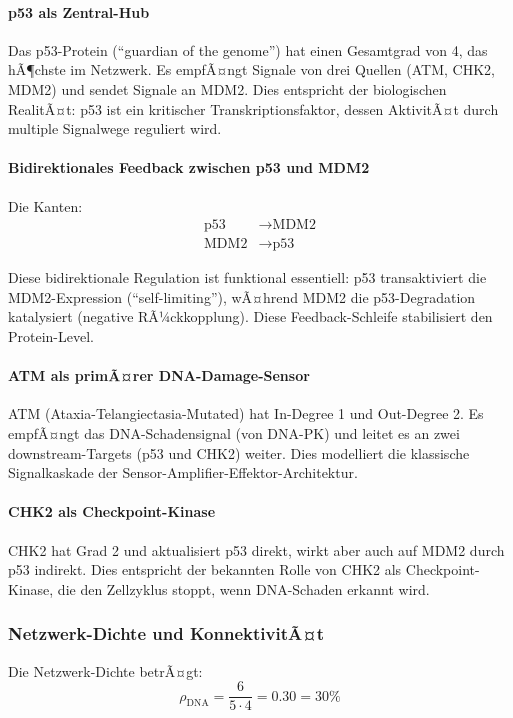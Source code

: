 ﻿\documentclass[a4paper,12pt]{article}
\theoremstyle{definition}
\begin{document}
\paragraph{p53 als Zentral-Hub}
Das p53-Protein (``guardian of the genome'') hat einen Gesamtgrad von 4, das hÃ¶chste im Netzwerk. Es empfÃ¤ngt Signale von drei Quellen (ATM, CHK2, MDM2) und sendet Signale an MDM2. Dies entspricht der biologischen RealitÃ¤t: p53 ist ein kritischer Transkriptionsfaktor, dessen AktivitÃ¤t durch multiple Signalwege reguliert wird.

\paragraph{Bidirektionales Feedback zwischen p53 und MDM2}
Die Kanten:
\begin{align*}
	\text{p53} &\rightarrow \text{MDM2} \\
	\text{MDM2} &\rightarrow \text{p53}
\end{align*}

Diese bidirektionale Regulation ist funktional essentiell: p53 transaktiviert die MDM2-Expression (``self-limiting''), wÃ¤hrend MDM2 die p53-Degradation katalysiert (negative RÃ¼ckkopplung). Diese Feedback-Schleife stabilisiert den Protein-Level.

\paragraph{ATM als primÃ¤rer DNA-Damage-Sensor}
ATM (Ataxia-Telangiectasia-Mutated) hat In-Degree 1 und Out-Degree 2. Es empfÃ¤ngt das DNA-Schadensignal (von DNA-PK) und leitet es an zwei downstream-Targets (p53 und CHK2) weiter. Dies modelliert die klassische Signalkaskade der Sensor-Amplifier-Effektor-Architektur.

\paragraph{CHK2 als Checkpoint-Kinase}
CHK2 hat Grad 2 und aktualisiert p53 direkt, wirkt aber auch auf MDM2 durch p53 indirekt. Dies entspricht der bekannten Rolle von CHK2 als Checkpoint-Kinase, die den Zellzyklus stoppt, wenn DNA-Schaden erkannt wird.

\subsubsection{Netzwerk-Dichte und KonnektivitÃ¤t}

Die Netzwerk-Dichte betrÃ¤gt:
\[
\rho_{\text{DNA}} = \frac{6}{5 \cdot 4} = 0.30 = 30\%
\]
\end{document}
